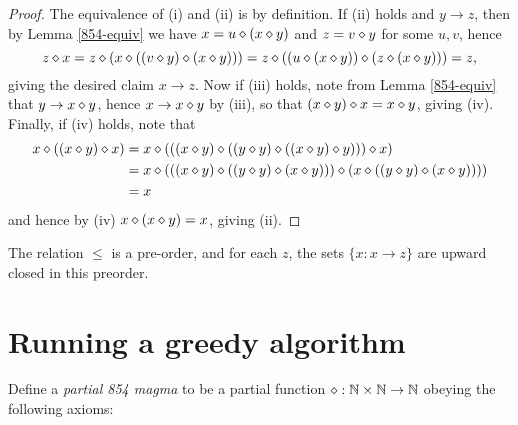 \begin{proof}  The equivalence of (i) and (ii) is by definition.  If (ii) holds and $y \to z$, then by  Lemma \ref{854-equiv} we have $x = u \diamond (x \diamond y)$ and $z = v \diamond y$ for some $u,v$, hence
  $$ z \diamond x = z \diamond (x \diamond ((v \diamond y) \diamond (x \diamond y))) = z \diamond ((u \diamond (x \diamond y)) \diamond (z \diamond (x \diamond y))) = z,$$
giving the desired claim $x \to z$.  Now if (iii) holds, note from Lemma \ref{854-equiv} that $y \to x \diamond y$, hence $x \to x \diamond y$ by (iii), so that $(x \diamond y) \diamond x = x \diamond y$, giving (iv).  Finally, if (iv) holds, note that
\begin{align*}
  x \diamond ((x \diamond y) \diamond x) &= x \diamond ( ((x \diamond y) \diamond ((y \diamond y) \diamond ((x \diamond y) \diamond y))) \diamond x) \\
  &= x \diamond (((x \diamond y) \diamond ((y \diamond y) \diamond (x \diamond y))) \diamond (x \diamond ((y \diamond y) \diamond (x \diamond y)))) \\
  &= x
\end{align*}
and hence by (iv) $x \diamond (x \diamond y) = x$, giving (ii).
\end{proof}

\begin{corollary}  The relation $\leq$ is a pre-order, and for each $z$, the sets $\{ x: x \to z \}$ are upward closed in this preorder.
\end{corollary}



\section{Running a greedy algorithm}

Define a \emph{partial 854 magma} to be a partial function $\diamond: \mathbb{N} \times \mathbb{N} \to \mathbb{N}$ obeying the following axioms:

